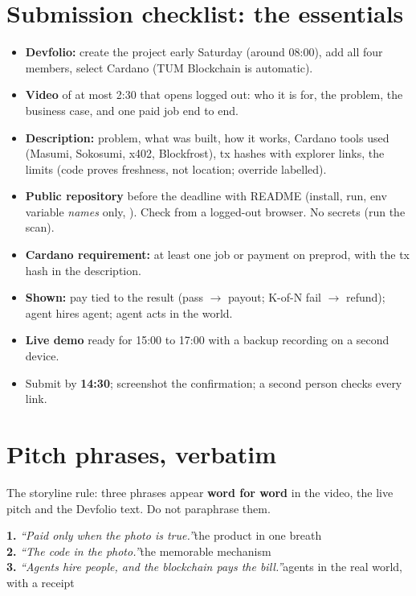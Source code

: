 \section{Submission checklist: the essentials}
\begin{itemize}
  \item \textbf{Devfolio:} create the project early Saturday (around 08:00), add all four members, select Cardano (TUM Blockchain is automatic).
  \item \textbf{Video} of at most 2:30 that opens logged out: who it is for, the problem, the business case, and one paid job end to end.
  \item \textbf{Description:} problem, what was built, how it works, Cardano tools used (Masumi, Sokosumi, x402, Blockfrost), tx hashes with explorer links, the limits (code proves freshness, not location; override labelled).
  \item \textbf{Public repository} before the deadline with README (install, run, env variable \emph{names} only, ). Check from a logged-out browser. No secrets (run the scan).
  \item \textbf{Cardano requirement:} at least one job or payment on preprod, with the tx hash in the description.
  \item \textbf{Shown:} pay tied to the result (pass $\rightarrow$ payout; K-of-N fail $\rightarrow$ refund); agent hires agent; agent acts in the world.
  \item \textbf{Live demo} ready for 15:00 to 17:00 with a backup recording on a second device.
  \item Submit by \textbf{14:30}; screenshot the confirmation; a second person checks every link.
\end{itemize}

\section{Pitch phrases, verbatim}
The storyline rule: three phrases appear \textbf{word for word} in the video, the live pitch and the Devfolio text. Do not paraphrase them.

\begin{center}
\begin{tcolorbox}[colback=cPurple!6,colframe=cPurple,boxrule=0.8pt,arc=2mm,width=0.94\textwidth]
\sffamily
\textbf{1.}\; \textit{``Paid only when the photo is true.''}\hfill the product in one breath\\[3pt]
\textbf{2.}\; \textit{``The code in the photo.''}\hfill the memorable mechanism\\[3pt]
\textbf{3.}\; \textit{``Agents hire people, and the blockchain pays the bill.''}\hfill agents in the real world, with a receipt
\end{tcolorbox}
\end{center}

